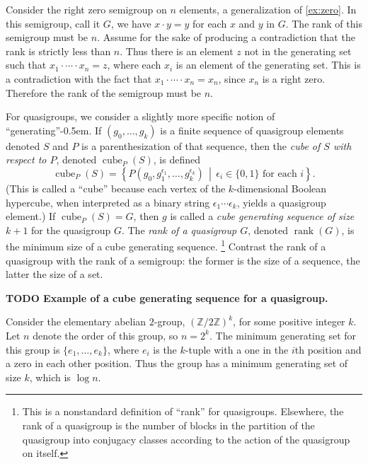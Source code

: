 \documentclass{article}
\newcommand{\todo}[1]{\textbf{TODO #1}}
\DeclareMathOperator{\cube}{cube}
\DeclareMathOperator{\rank}{rank}
\begin{document}
\begin{example}\label{ex:semigroupgen}
  Consider the right zero semigroup on $n$ elements, a generalization of \autoref{ex:zero}.
  In this semigroup, call it $G$, we have $x \cdot y = y$ for each $x$ and $y$ in $G$.
  The rank of this semigroup must be $n$.
  Assume for the sake of producing a contradiction that the rank is strictly less than $n$.
  Thus there is an element $z$ not in the generating set such that $x_1 \cdot \dotsb \cdot x_n = z$, where each $x_i$ is an element of the generating set.
  This is a contradiction with the fact that $x_1 \cdot \dotsb \cdot x_n = x_n$, since $x_n$ is a right zero.
  Therefore the rank of the semigroup must be $n$.
\end{example}

For quasigroups, we consider a slightly more specific notion of ``generating''\kern-0.5em.
If $(g_0, \dotsc, g_k)$ is a finite sequence of quasigroup elements denoted $S$ and $P$ is a parenthesization of that sequence, then the \emph{cube of $S$ with respect to $P$}, denoted $\cube_P(S)$, is defined
\begin{equation*}
  \cube_P(S) = \left\{P(g_0, g_1^{\epsilon_1}, \dotsc, g_k^{\epsilon_k}) \, \middle| \, \epsilon_i \in \{0, 1\} \text{ for each } i \right\}.
\end{equation*}
(This is called a ``cube'' because each vertex of the $k$-dimensional Boolean hypercube, when interpreted as a binary string $\epsilon_1 \dotsb \epsilon_k$, yields a quasigroup element.)
If $\cube_P(S) = G$, then $g$ is called a \emph{cube generating sequence of size $k + 1$} for the quasigroup $G$.
The \emph{rank of a quasigroup $G$}, denoted $\rank(G)$, is the minimum size of a cube generating sequence.
\footnote{
  This is a nonstandard definition of ``rank'' for quasigroups.
  Elsewhere, the rank of a quasigroup is the number of blocks in the partition of the quasigroup into conjugacy classes according to the action of the quasigroup on itself.
}
Contrast the rank of a quasigroup with the rank of a semigroup: the former is the size of a sequence, the latter the size of a set.

\begin{example}
  \todo{Example of a cube generating sequence for a quasigroup.}
\end{example}

\begin{example}
  Consider the elementary abelian $2$-group, $(\mathbb{Z} / 2 \mathbb{Z})^k$, for some positive integer $k$.
  Let $n$ denote the order of this group, so $n = 2^k$.
  The minimum generating set for this group is $\{e_1, \dotsc, e_k\}$, where $e_i$ is the $k$-tuple with a one in the $i$th position and a zero in each other position.
  Thus the group has a minimum generating set of size $k$, which is $\log n$.
\end{example}
\end{document}
